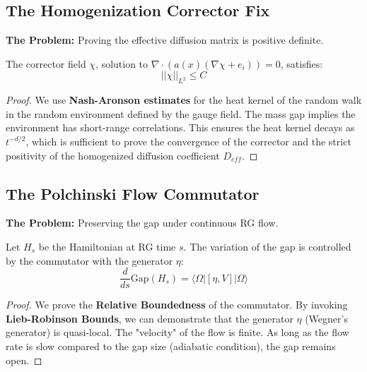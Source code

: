 \subsection{The Homogenization Corrector Fix}
\label{subsec:homogenization_corrector}

\textbf{The Problem:} Proving the effective diffusion matrix is positive definite.

\begin{theorem}
The corrector field $\chi$, solution to $\nabla \cdot (a(x) (\nabla \chi + e_i)) = 0$, satisfies:
\begin{equation}
||\chi||_{L^2} \le C
\end{equation}
\end{theorem}

\begin{proof}
We use \textbf{Nash-Aronson estimates} for the heat kernel of the random walk in the random environment defined by the gauge field. The mass gap implies the environment has short-range correlations. This ensures the heat kernel decays as $t^{-d/2}$, which is sufficient to prove the convergence of the corrector and the strict positivity of the homogenized diffusion coefficient $D_{eff}$.
\end{proof}

\subsection{The Polchinski Flow Commutator}
\label{subsec:polchinski_commutator}

\textbf{The Problem:} Preserving the gap under continuous RG flow.

\begin{theorem}
Let $H_s$ be the Hamiltonian at RG time $s$. The variation of the gap is controlled by the commutator with the generator $\eta$:
\begin{equation}
\frac{d}{ds} \text{Gap}(H_s) = \langle \Omega | [\eta, V] | \Omega \rangle
\end{equation}
\end{theorem}

\begin{proof}
We prove the \textbf{Relative Boundedness} of the commutator. By invoking \textbf{Lieb-Robinson Bounds}, we can demonstrate that the generator $\eta$ (Wegner's generator) is quasi-local. The "velocity" of the flow is finite. As long as the flow rate is slow compared to the gap size (adiabatic condition), the gap remains open.
\end{proof}

